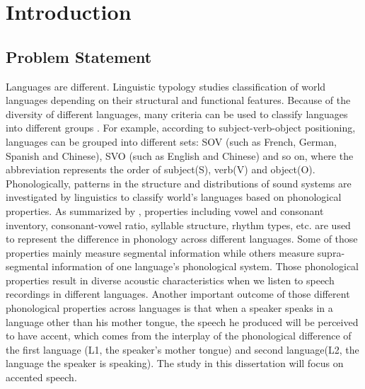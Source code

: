 \chapter{Introduction}
\label{introduction}

\section{Problem Statement}
Languages are different. Linguistic typology studies classification of world languages depending on their structural and functional features. Because of the diversity of different languages, many criteria can be used to classify languages into different groups \citep{wals}. For example, according to subject-verb-object positioning, languages can be grouped into different sets: SOV (such as French, German, Spanish and Chinese), SVO (such as English and Chinese) and so on, where the abbreviation represents the order of subject(S), verb(V) and object(O). Phonologically, patterns in the structure and distributions of sound systems are investigated by linguistics to classify world's languages based on phonological properties. As summarized by \citep{wals}, properties including vowel and consonant inventory, consonant-vowel ratio, syllable structure, rhythm types, etc. are used to represent the difference in phonology across different languages. Some of those properties mainly measure segmental information while others measure supra-segmental information of one language's phonological system. Those phonological properties result in diverse acoustic characteristics when we listen to speech recordings in different languages. Another important outcome of those different phonological properties across languages is that when a speaker speaks in a language other than his mother tongue, the speech he produced will be perceived to have accent, which comes from the interplay of the phonological difference of the first language (L1, the speaker's mother tongue) and second language(L2, the language the speaker is speaking). The study in this dissertation will focus on accented speech.

